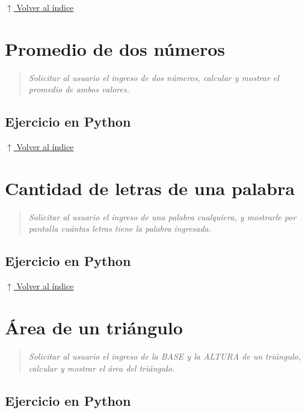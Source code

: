 \documentclass[12pt]{article}
\newcommand{\codigopython}[2]{%
}
\newcommand{\volverindice}{%
    \vspace{1em}%
    \begin{flushright}%
        \hyperlink{indice}{\small $\uparrow$ Volver al índice}%
    \end{flushright}%
}
\newcommand{\enunciado}[1]{%
    \begin{quote}
        \itshape #1
    \end{quote}
}
\begin{document}
\codigopython{05}{Mensaje de bienvenida con nombre completo}

\volverindice
\newpage


\section{Promedio de dos números}

\enunciado{Solicitar al usuario el ingreso de dos números, calcular y mostrar el promedio de ambos valores.}

\subsection*{Ejercicio en Python}

\codigopython{06}{Promedio de dos números}

\volverindice
\newpage


\section{Cantidad de letras de una palabra}

\enunciado{Solicitar al usuario el ingreso de una palabra cualquiera, y mostrarle por pantalla cuántas letras tiene la palabra ingresada.}

\subsection*{Ejercicio en Python}

\codigopython{07}{Cantidad de letras de una palabra}

\volverindice
\newpage


\section{Área de un triángulo}

\enunciado{Solicitar al usuario el ingreso de la BASE y la ALTURA de un triángulo, calcular y mostrar el área del triángulo.}

\subsection*{Ejercicio en Python}
\end{document}
